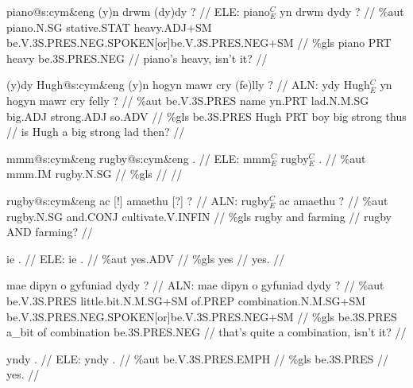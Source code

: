 \documentclass[a4paper,10pt]{article}
\begin{document}
\ex
\begingl[lingstyle=gergl]
\glchat piano@s:cym\&eng (y)n drwm (dy)dy ? //
\glsurface ELE:  piano$^{C}_{E}$ yn drwm dydy ?  //
\glauto \%aut  piano{\scriptsize .N.SG} stative{\scriptsize .STAT} heavy{\scriptsize .ADJ+SM} be{\scriptsize .V.3S.PRES.NEG.SPOKEN[or]be.V.3S.PRES.NEG+SM}   //
\glmanual \%gls  piano PRT heavy be{\scriptsize .3S.PRES.NEG}   //
\gleng piano's heavy, isn't it? //
\endgl
\xe

\ex
\begingl[lingstyle=gergl]
\glchat (y)dy Hugh@s:cym\&eng (y)n hogyn mawr cry (fe)lly ? //
\glsurface ALN:  ydy Hugh$^{C}_{E}$ yn hogyn mawr cry felly ?  //
\glauto \%aut  be{\scriptsize .V.3S.PRES} name yn{\scriptsize .PRT} lad{\scriptsize .N.M.SG} big{\scriptsize .ADJ} strong{\scriptsize .ADJ} so{\scriptsize .ADV}   //
\glmanual \%gls  be{\scriptsize .3S.PRES} Hugh PRT boy big strong thus   //
\gleng is Hugh a big strong lad then? //
\endgl
\xe

\ex
\begingl[lingstyle=gergl]
\glchat mmm@s:cym\&eng rugby@s:cym\&eng . //
\glsurface ELE:  mmm$^{C}_{E}$ rugby$^{C}_{E}$ .  //
\glauto \%aut  mmm{\scriptsize .IM} rugby{\scriptsize .N.SG}   //
\glmanual \%gls      //
\gleng  //
\endgl
\xe

\ex
\begingl[lingstyle=gergl]
\glchat rugby@s:cym\&eng ac [!] amaethu [?] ? //
\glsurface ALN:  rugby$^{C}_{E}$ ac amaethu ?  //
\glauto \%aut  rugby{\scriptsize .N.SG} and{\scriptsize .CONJ} cultivate{\scriptsize .V.INFIN}   //
\glmanual \%gls  rugby and farming   //
\gleng rugby AND farming? //
\endgl
\xe

\ex
\begingl[lingstyle=gergl]
\glchat ie . //
\glsurface ELE:  ie .  //
\glauto \%aut  yes{\scriptsize .ADV}   //
\glmanual \%gls  yes   //
\gleng yes. //
\endgl
\xe

\ex
\begingl[lingstyle=gergl]
\glchat mae dipyn o gyfuniad dydy ? //
\glsurface ALN:  mae dipyn o gyfuniad dydy ?  //
\glauto \%aut  be{\scriptsize .V.3S.PRES} little{\scriptsize .bit.N.M.SG+SM} of{\scriptsize .PREP} combination{\scriptsize .N.M.SG+SM} be{\scriptsize .V.3S.PRES.NEG.SPOKEN[or]be.V.3S.PRES.NEG+SM}   //
\glmanual \%gls  be{\scriptsize .3S.PRES} a\_bit of combination be{\scriptsize .3S.PRES.NEG}   //
\gleng that's quite a combination, isn't it? //
\endgl
\xe

\ex
\begingl[lingstyle=gergl]
\glchat yndy . //
\glsurface ELE:  yndy .  //
\glauto \%aut  be{\scriptsize .V.3S.PRES.EMPH}   //
\glmanual \%gls  be{\scriptsize .3S.PRES}   //
\gleng yes. //
\endgl
\xe
\end{document}
